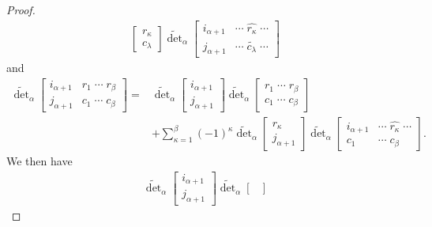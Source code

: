 \documentclass{amsart}
\begin{document}
{{\begin{proof}
\begin{align}
\begin{bmatrix}
                    r_\kappa\\
                    c_\lambda
                \end{bmatrix}\widetilde{\det}_\alpha\begin{bmatrix}
                    i_{\alpha+1}&\cdots\;\widehat{r_\kappa}\;\cdots\\
                    j_{\alpha+1}&\cdots\;\widetilde{c_\lambda}\;\cdots
                \end{bmatrix}
            \end{align}
            and 
            \begin{align}
                \widetilde{\det}_\alpha\begin{bmatrix}
                    i_{\alpha+1}&r_1\;\cdots\;r_\beta\\
                    j_{\alpha+1}&c_1\;\cdots\;c_\beta
                \end{bmatrix}={}& \widetilde{\det}_\alpha\begin{bmatrix}
                    i_{\alpha+1}\\
                    j_{\alpha+1}
                \end{bmatrix}\widetilde{\det}_\alpha\begin{bmatrix}
                    r_1\;\cdots\;r_\beta\\
                    c_1\;\cdots\;c_\beta
                \end{bmatrix}\\
                &+\sum_{\kappa=1}^\beta(-1)^\kappa\widetilde{\det}_\alpha\begin{bmatrix}
                    r_\kappa\\
                    j_{\alpha+1}
                \end{bmatrix}\widetilde{\det}_\alpha\begin{bmatrix}
                    i_{\alpha+1}&\cdots\;\widehat{r_\kappa}\;\cdots\\
                    c_1&\cdots\;c_\beta
                \end{bmatrix}. 
            \end{align}
            We then have 
            \begin{align}
                \widetilde{\det}_\alpha\begin{bmatrix}
                    i_{\alpha+1}\\
                    j_{\alpha+1}
                \end{bmatrix}\widetilde{\det}_\alpha\begin{bmatrix}

\end{bmatrix}
\end{align}
\end{proof}}}
\end{document}

